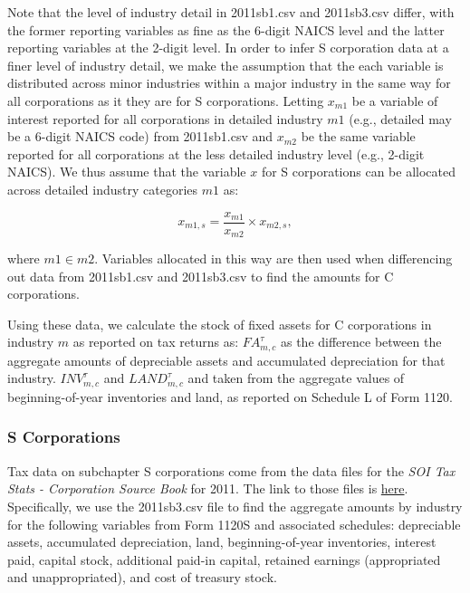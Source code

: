 \documentclass[article,11pt,letterpaper,fleqn]{article}
\theoremstyle{definition}
\numberwithin{equation}{section}
\begin{document}
Note that the level of industry detail in 2011sb1.csv and 2011sb3.csv differ, with the former reporting variables as fine as the 6-digit NAICS level and the latter reporting variables at the 2-digit level.  In order to infer S corporation data at a finer level of industry detail, we make the assumption that the each variable is distributed across minor industries within a major industry in the same way for all corporations as it they are for S corporations.  Letting $x_{m1}$ be a variable of interest reported for all corporations in detailed industry $m1$ (e.g., detailed may be a 6-digit NAICS code) from 2011sb1.csv and $x_{m2}$ be the same variable reported for all corporations at the less detailed industry level (e.g., 2-digit NAICS).  We thus assume that the variable $x$ for S corporations can be allocated across detailed industry categories $m1$ as:

\begin{equation}
x_{m1,s}=\frac{x_{m1}}{x_{m2}}\times x_{m2,s},
\end{equation}

\noindent\noindent where $m1\in m2$.  Variables allocated in this way are then used when differencing out data from 2011sb1.csv and 2011sb3.csv to find the amounts for C corporations.

Using these data, we calculate the stock of fixed assets for C corporations in industry $m$ as reported on tax returns as: ${FA}^{\tau}_{m,c}$ as the difference between the aggregate amounts of depreciable assets and accumulated depreciation for that industry.  ${INV}^{\tau}_{m,c}$ and ${LAND}^{\tau}_{m,c}$ and taken from the aggregate values of beginning-of-year inventories and land, as reported on Schedule L of Form 1120.

\subsubsection{S Corporations}

Tax data on subchapter S corporations come from the data files for the \emph{SOI Tax Stats - Corporation Source Book} for 2011.  The link to those files is \href{http://www.irs.gov/uac/SOI-Tax-Stats-Corporation-Source-Book:-Data-File}{here}.  Specifically, we use the 2011sb3.csv file to find the aggregate amounts by industry for the following variables from Form 1120S and associated schedules: depreciable assets, accumulated depreciation, land, beginning-of-year inventories, interest paid, capital stock, additional paid-in capital, retained earnings (appropriated and unappropriated), and cost of treasury stock.  
\end{document}
